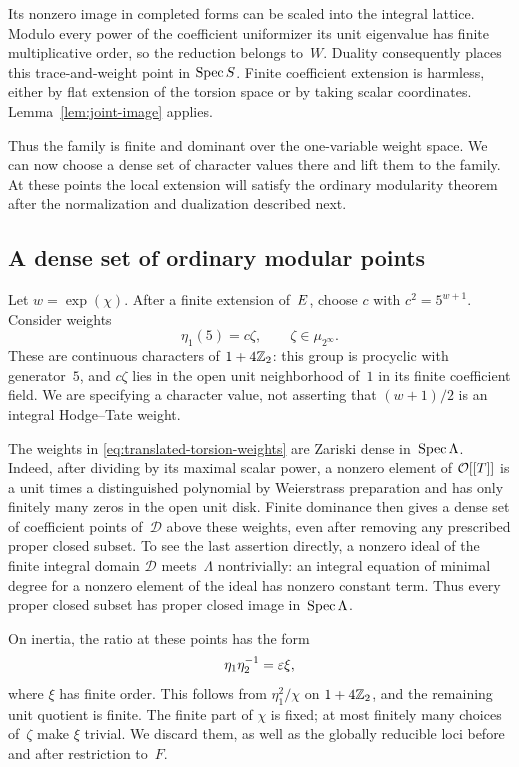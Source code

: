 Its nonzero image in completed forms can be scaled into the integral
lattice.  Modulo every power of the coefficient uniformizer its unit
eigenvalue has finite multiplicative order, so the reduction belongs
to~$W$.  Duality consequently places this trace-and-weight point in
$\operatorname{Spec} S$.  Finite coefficient extension is harmless, either by flat
extension of the torsion space or by taking scalar coordinates.
Lemma~\ref{lem:joint-image} applies.

Thus the family is finite and dominant over the one-variable weight
space.  We can now choose a dense set of character values there and
lift them to the family.  At these points the local extension will
satisfy the ordinary modularity theorem after the normalization and
dualization described next.

\subsection{A dense set of ordinary modular points}

Let $w=\operatorname{exp}(\chi)$.  After a finite extension of~$E$,
choose $c$ with $c^2=5^{w+1}$.  Consider weights
\begin{equation}\label{eq:translated-torsion-weights}
                 \eta_1(5)=c\zeta,
       \qquad \zeta\in\mu_{2^\infty}.
\end{equation}
These are continuous characters of $1+4\mathbb Z_2$: this group is procyclic
with generator~$5$, and $c\zeta$ lies in the open unit neighborhood
of~$1$ in its finite coefficient field.  We are specifying a character
value, not asserting that $(w+1)/2$ is an integral Hodge--Tate weight.

The weights in \eqref{eq:translated-torsion-weights} are Zariski dense
in~$\operatorname{Spec}\Lambda$.  Indeed, after dividing by its maximal scalar power,
a nonzero element of $\mathcal O[[T]]$ is a unit times a distinguished
polynomial by Weierstrass preparation and has only finitely many zeros
in the open unit disk.  Finite dominance then gives a dense set of
coefficient points of~$\mathscr D$ above these weights, even after
removing any prescribed proper closed subset.  To see the last assertion
directly, a nonzero ideal of the finite integral domain $\mathscr D$
meets~$\Lambda$ nontrivially: an integral equation of minimal degree for
a nonzero element of the ideal has nonzero constant term.  Thus every
proper closed subset has proper closed image in~$\operatorname{Spec}\Lambda$.

On inertia, the ratio at these points has the form
\begin{equation}\label{eq:ordinary-ratio-xi}
                    \eta_1\eta_2^{-1}=\varepsilon\xi,
\end{equation}
where $\xi$ has finite order.  This follows from
$\eta_1^2/\chi$ on $1+4\mathbb Z_2$, and the remaining unit quotient is
finite.  The finite part of $\chi$ is fixed; at most finitely many
choices of~$\zeta$ make $\xi$ trivial.  We discard them, as well as the
globally reducible loci before and after restriction to~$F$.

